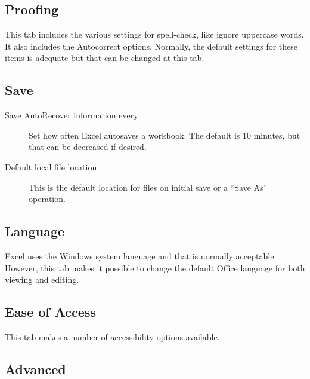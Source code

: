 \subsection{Proofing}

This tab includes the various settings for spell-check, like ignore uppercase words. It also includes the Autocorrect options. Normally, the default settings for these items is adequate but that can be changed at this tab.

\subsection{Save}

\begin{description}
	\item[Save AutoRecover information every] Set how often Excel autosaves a workbook. The default is $ 10 $ minutes, but that can be decreased if desired.
	\item[Default local file location] This is the default location for files on initial save or a ``Save As'' operation.
\end{description}

\subsection{Language}

Excel uses the Windows system language and that is normally acceptable. However, this tab makes it possible to change the default Office language for both viewing and editing.

\subsection{Ease of Access}

This tab makes a number of accessibility options available. 

\subsection{Advanced}
	
